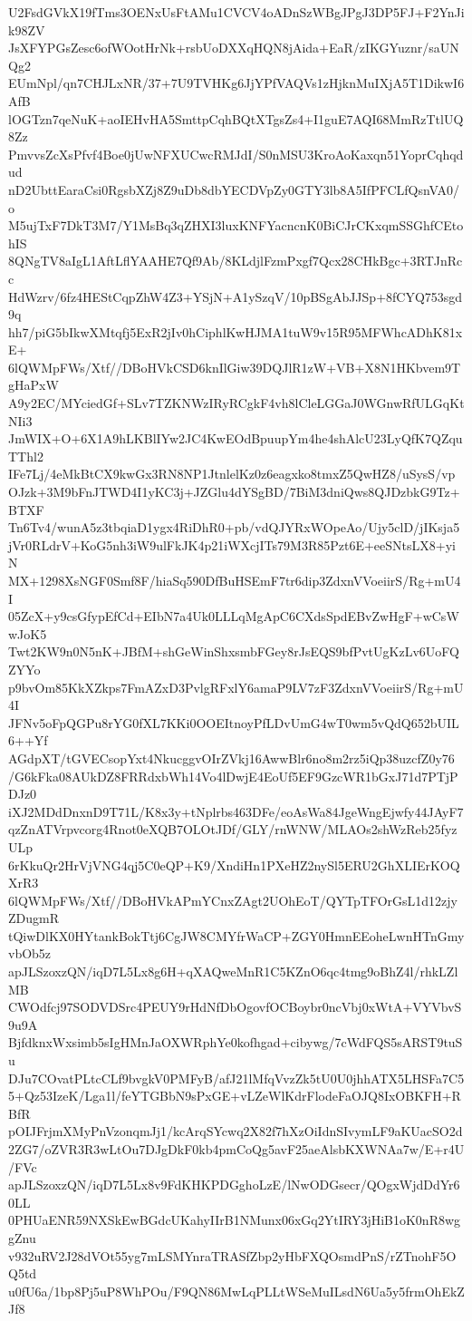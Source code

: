 U2FsdGVkX19fTms3OENxUsFtAMu1CVCV4oADnSzWBgJPgJ3DP5FJ+F2YnJik98ZV
JsXFYPGsZesc6ofWOotHrNk+rsbUoDXXqHQN8jAida+EaR/zIKGYuznr/saUNQg2
EUmNpl/qn7CHJLxNR/37+7U9TVHKg6JjYPfVAQVs1zHjknMuIXjA5T1DikwI6AfB
lOGTzn7qeNuK+aoIEHvHA5SmttpCqhBQtXTgsZs4+I1guE7AQI68MmRzTtlUQ8Zz
PmvvsZcXsPfvf4Boe0jUwNFXUCwcRMJdI/S0nMSU3KroAoKaxqn51YoprCqhqdud
nD2UbttEaraCsi0RgsbXZj8Z9uDb8dbYECDVpZy0GTY3lb8A5IfPFCLfQsnVA0/o
M5ujTxF7DkT3M7/Y1MsBq3qZHXI3luxKNFYacncnK0BiCJrCKxqmSSGhfCEtohIS
8QNgTV8aIgL1AftLflYAAHE7Qf9Ab/8KLdjlFzmPxgf7Qcx28CHkBgc+3RTJnRcc
HdWzrv/6fz4HEStCqpZhW4Z3+YSjN+A1ySzqV/10pBSgAbJJSp+8fCYQ753sgd9q
hh7/piG5bIkwXMtqfj5ExR2jIv0hCiphlKwHJMA1tuW9v15R95MFWhcADhK81xE+
6lQWMpFWs/Xtf//DBoHVkCSD6knIlGiw39DQJlR1zW+VB+X8N1HKbvem9TgHaPxW
A9y2EC/MYciedGf+SLv7TZKNWzIRyRCgkF4vh8lCleLGGaJ0WGnwRfULGqKtNIi3
JmWIX+O+6X1A9hLKBlIYw2JC4KwEOdBpuupYm4he4shAlcU23LyQfK7QZquTThl2
IFe7Lj/4eMkBtCX9kwGx3RN8NP1JtnlelKz0z6eagxko8tmxZ5QwHZ8/uSysS/vp
OJzk+3M9bFnJTWD4I1yKC3j+JZGlu4dYSgBD/7BiM3dniQws8QJDzbkG9Tz+BTXF
Tn6Tv4/wunA5z3tbqiaD1ygx4RiDhR0+pb/vdQJYRxWOpeAo/Ujy5clD/jIKsja5
jVr0RLdrV+KoG5nh3iW9ulFkJK4p21iWXcjITs79M3R85Pzt6E+eeSNtsLX8+yiN
MX+1298XsNGF0Smf8F/hiaSq590DfBuHSEmF7tr6dip3ZdxnVVoeiirS/Rg+mU4I
05ZcX+y9csGfypEfCd+EIbN7a4Uk0LLLqMgApC6CXdsSpdEBvZwHgF+wCsWwJoK5
Twt2KW9n0N5nK+JBfM+shGeWinShxsmbFGey8rJsEQS9bfPvtUgKzLv6UoFQZYYo
p9bvOm85KkXZkps7FmAZxD3PvlgRFxlY6amaP9LV7zF3ZdxnVVoeiirS/Rg+mU4I
JFNv5oFpQGPu8rYG0fXL7KKi0OOEItnoyPfLDvUmG4wT0wm5vQdQ652bUIL6++Yf
AGdpXT/tGVECsopYxt4NkucggvOIrZVkj16AwwBlr6no8m2rz5iQp38uzcfZ0y76
/G6kFka08AUkDZ8FRRdxbWh14Vo4lDwjE4EoUf5EF9GzcWR1bGxJ71d7PTjPDJz0
iXJ2MDdDnxnD9T71L/K8x3y+tNplrbs463DFe/eoAsWa84JgeWngEjwfy44JAyF7
qzZnATVrpvcorg4Rnot0eXQB7OLOtJDf/GLY/rnWNW/MLAOs2shWzReb25fyzULp
6rKkuQr2HrVjVNG4qj5C0eQP+K9/XndiHn1PXeHZ2nySl5ERU2GhXLIErKOQXrR3
6lQWMpFWs/Xtf//DBoHVkAPmYCnxZAgt2UOhEoT/QYTpTFOrGsL1d12zjyZDugmR
tQiwDlKX0HYtankBokTtj6CgJW8CMYfrWaCP+ZGY0HmnEEoheLwnHTnGmyvbOb5z
apJLSzoxzQN/iqD7L5Lx8g6H+qXAQweMnR1C5KZnO6qc4tmg9oBhZ4l/rhkLZlMB
CWOdfcj97SODVDSrc4PEUY9rHdNfDbOgovfOCBoybr0ncVbj0xWtA+VYVbvS9u9A
BjfdknxWxsimb5sIgHMnJaOXWRphYe0kofhgad+cibywg/7cWdFQS5sARST9tuSu
DJu7COvatPLtcCLf9bvgkV0PMFyB/afJ21lMfqVvzZk5tU0U0jhhATX5LHSFa7C5
5+Qz53IzeK/Lga1l/feYTGBbN9sPxGE+vLZeWlKdrFlodeFaOJQ8IxOBKFH+RBfR
pOIJFrjmXMyPnVzonqmJj1/kcArqSYcwq2X82f7hXzOiIdnSIvymLF9aKUacSO2d
2ZG7/oZVR3R3wLtOu7DJgDkF0kb4pmCoQg5avF25aeAlsbKXWNAa7w/E+r4U/FVc
apJLSzoxzQN/iqD7L5Lx8v9FdKHKPDGghoLzE/lNwODGsecr/QOgxWjdDdYr60LL
0PHUaENR59NXSkEwBGdcUKahyIIrB1NMunx06xGq2YtIRY3jHiB1oK0nR8wggZnu
v932uRV2J28dVOt55yg7mLSMYnraTRASfZbp2yHbFXQOsmdPnS/rZTnohF5OQ5td
u0fU6a/1bp8Pj5uP8WhPOu/F9QN86MwLqPLLtWSeMuILsdN6Ua5y5frmOhEkZJf8

